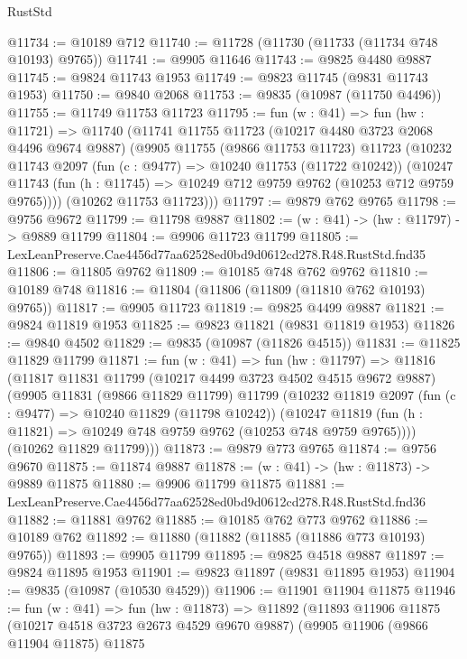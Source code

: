 \begin{lexlean}{RustStd}
\begin{coremodule}
@11734 := @10189 @712
@11740 := @11728 (@11730 (@11733 (@11734 @748 @10193) @9765))
@11741 := @9905 @11646
@11743 := @9825 @4480 @9887
@11745 := @9824 @11743 @1953
@11749 := @9823 @11745 (@9831 @11743 @1953)
@11750 := @9840 @2068
@11753 := @9835 (@10987 (@11750 @4496))
@11755 := @11749 @11753 @11723
@11795 := fun (w : @41) =>
  fun (hw : @11721) =>
  @11740
    (@11741
      @11755
      @11723
      (@10217 @4480 @3723 @2068 @4496 @9674 @9887)
      (@9905
        @11755
        (@9866 @11753 @11723)
        @11723
        (@10232
          @11743
          @2097
          (fun (c : @9477) => @10240 @11753 (@11722 @10242))
          (@10247 @11743 (fun (h : @11745) => @10249 @712 @9759 @9762 (@10253 @712 @9759 @9765))))
        (@10262 @11753 @11723)))
@11797 := @9879 @762 @9765
@11798 := @9756 @9672
@11799 := @11798 @9887
@11802 := (w : @41) -> (hw : @11797) -> @9889 @11799
@11804 := @9906 @11723 @11799
@11805 := LexLeanPreserve.Cae4456d77aa62528ed0bd9d0612cd278.R48.RustStd.fnd35
@11806 := @11805 @9762
@11809 := @10185 @748 @762 @9762
@11810 := @10189 @748
@11816 := @11804 (@11806 (@11809 (@11810 @762 @10193) @9765))
@11817 := @9905 @11723
@11819 := @9825 @4499 @9887
@11821 := @9824 @11819 @1953
@11825 := @9823 @11821 (@9831 @11819 @1953)
@11826 := @9840 @4502
@11829 := @9835 (@10987 (@11826 @4515))
@11831 := @11825 @11829 @11799
@11871 := fun (w : @41) =>
  fun (hw : @11797) =>
  @11816
    (@11817
      @11831
      @11799
      (@10217 @4499 @3723 @4502 @4515 @9672 @9887)
      (@9905
        @11831
        (@9866 @11829 @11799)
        @11799
        (@10232
          @11819
          @2097
          (fun (c : @9477) => @10240 @11829 (@11798 @10242))
          (@10247 @11819 (fun (h : @11821) => @10249 @748 @9759 @9762 (@10253 @748 @9759 @9765))))
        (@10262 @11829 @11799)))
@11873 := @9879 @773 @9765
@11874 := @9756 @9670
@11875 := @11874 @9887
@11878 := (w : @41) -> (hw : @11873) -> @9889 @11875
@11880 := @9906 @11799 @11875
@11881 := LexLeanPreserve.Cae4456d77aa62528ed0bd9d0612cd278.R48.RustStd.fnd36
@11882 := @11881 @9762
@11885 := @10185 @762 @773 @9762
@11886 := @10189 @762
@11892 := @11880 (@11882 (@11885 (@11886 @773 @10193) @9765))
@11893 := @9905 @11799
@11895 := @9825 @4518 @9887
@11897 := @9824 @11895 @1953
@11901 := @9823 @11897 (@9831 @11895 @1953)
@11904 := @9835 (@10987 (@10530 @4529))
@11906 := @11901 @11904 @11875
@11946 := fun (w : @41) =>
  fun (hw : @11873) =>
  @11892
    (@11893
      @11906
      @11875
      (@10217 @4518 @3723 @2673 @4529 @9670 @9887)
      (@9905
        @11906
        (@9866 @11904 @11875)
        @11875

\end{coremodule}
\end{lexlean}
